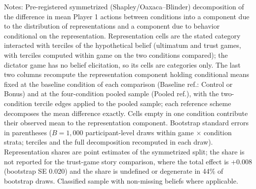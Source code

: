 \begin{table}[!htbp]
\begin{flushleft}
\footnotesize Notes: Pre-registered symmetrized (Shapley/Oaxaca--Blinder) decomposition of the difference in mean Player 1 actions between conditions into a component due to the distribution of representations and a component due to behavior conditional on the representation. Representation cells are the stated category interacted with terciles of the hypothetical belief (ultimatum and trust games, with terciles computed within game on the two conditions compared); the dictator game has no belief elicitation, so its cells are categories only. The last two columns recompute the representation component holding conditional means fixed at the baseline condition of each comparison (Baseline ref.: Control or Bonus) and at the four-condition pooled sample (Pooled ref.), with the two-condition tercile edges applied to the pooled sample; each reference scheme decomposes the mean difference exactly. Cells empty in one condition contribute their observed mean to the representation component. Bootstrap standard errors in parentheses ($B=1{,}000$ participant-level draws within game $\times$ condition strata; terciles and the full decomposition recomputed in each draw). Representation shares are point estimates of the symmetrized split; the share is not reported for the trust-game story comparison, where the total effect is +0.008 (bootstrap SE 0.020) and the share is undefined or degenerate in 44\% of bootstrap draws. Classified sample with non-missing beliefs where applicable.
\end{flushleft}
\end{table}

